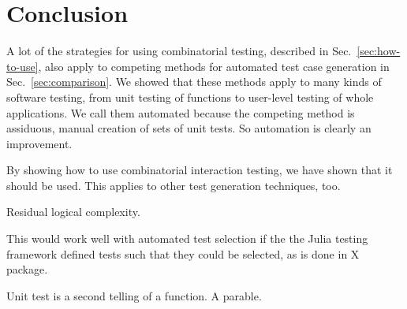 \documentclass{juliacon}
\begin{document}
\section{Conclusion}
A lot of the strategies for using combinatorial testing, described in Sec.~\ref{sec:how-to-use}, also apply to competing methods for automated test case generation in Sec.~\ref{sec:comparison}. We showed that these methods apply to many kinds of software testing, from unit testing of functions to user-level testing of whole applications. We call them automated because the competing method is assiduous, manual creation of sets of unit tests. So automation is clearly an improvement.

\vskip 6pt
By showing how to use combinatorial interaction testing, we have shown that it should be used. This applies to other test generation techniques, too.

\vskip 6pt
Residual logical complexity.



\vskip 6pt
This would work well with automated test selection if the the Julia testing framework defined tests such that they could be selected, as is done in X package.


\vskip 6pt
Unit test is a second telling of a function. A parable.


\end{document}
